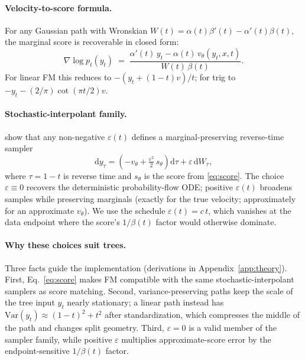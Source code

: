 \documentclass{uai2026}
\newcommand{\Var}{\mathrm{Var}}
\newcommand{\dd}{\mathrm{d}}
\begin{document}
\paragraph{Velocity-to-score formula.} For any Gaussian path with Wronskian $W(t) = \alpha(t) \beta'(t) - \alpha'(t) \beta(t)$, the marginal score is recoverable in closed form:
\begin{equation}\label{eq:score}
\nabla \log p_t(y_t) \;=\; \frac{\alpha'(t)\, y_t - \alpha(t)\, v_\theta(y_t, x, t)}{W(t)\,\beta(t)}.
\end{equation}
For linear FM this reduces to $-(y_t + (1-t) v)/t$; for trig to $-y_t - (2/\pi)\cot(\pi t/2) v$.

\paragraph{Stochastic-interpolant family.} \citet{albergo2023stochastic} show that any non-negative $\varepsilon(t)$ defines a marginal-preserving reverse-time sampler
\begin{equation}\label{eq:sde}
\dd y_\tau = \left(-v_\theta + \tfrac{\varepsilon^2}{2}\, s_\theta\right) \dd \tau + \varepsilon\, \dd W_\tau,
\end{equation}
where $\tau = 1 - t$ is reverse time and $s_\theta$ is the score from \eqref{eq:score}. The choice $\varepsilon \equiv 0$ recovers the deterministic probability-flow ODE; positive $\varepsilon(t)$ broadens samples while preserving marginals (exactly for the true velocity; approximately for an approximate $v_\theta$). We use the schedule $\varepsilon(t) = c\, t$, which vanishes at the data endpoint where the score's $1/\beta(t)$ factor would otherwise dominate.

\paragraph{Why these choices suit trees.} Three facts guide the implementation (derivations in Appendix~\ref{app:theory}). First, Eq.~\eqref{eq:score} makes FM compatible with the same stochastic-interpolant samplers as score matching. Second, variance-preserving paths keep the scale of the tree input $y_t$ nearly stationary; a linear path instead has $\Var(y_t)\approx(1-t)^2+t^2$ after standardization, which compresses the middle of the path and changes split geometry. Third, $\varepsilon=0$ is a valid member of the sampler family, while positive $\varepsilon$ multiplies approximate-score error by the endpoint-sensitive $1/\beta(t)$ factor.
\end{document}
